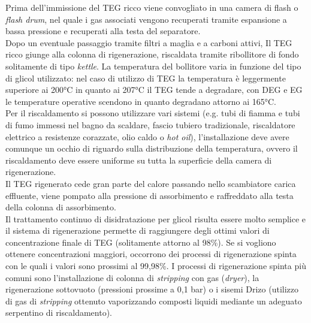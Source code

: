 Prima dell'immissione del TEG ricco viene convogliato in una camera di flash o \textit{flash drum}, nel quale i gas associati vengono recuperati tramite espansione a bassa pressione e recuperati alla testa del separatore. \\
Dopo un eventuale passaggio tramite filtri a maglia e a carboni attivi, Il TEG ricco giunge alla colonna di rigenerazione, riscaldata tramite ribollitore di fondo solitamente di tipo \textit{kettle}. La temperatura del bollitore varia in funzione del tipo di glicol utilizzato: nel caso di utilizzo di TEG la temperatura è leggermente superiore ai 200°C in quanto ai 207°C il TEG tende a degradare, con DEG e EG le temperature operative scendono in quanto degradano attorno ai 165°C.\\
Per il riscaldamento si possono utilizzare vari sistemi (e.g. tubi di fiamma e tubi di fumo immessi nel bagno da scaldare, fascio tubiero tradizionale, riscaldatore elettrico a resistenze corazzate, olio caldo o \textit{hot oil}), l'installazione deve avere comunque un occhio di riguardo sulla distribuzione della temperatura, ovvero il riscaldamento deve essere uniforme su tutta la superficie della camera di rigenerazione. \\
Il TEG rigenerato cede gran parte del calore passando nello scambiatore carica effluente, viene pompato alla pressione di assorbimento e raffreddato alla testa della colonna di assorbimento.\\
Il trattamento continuo di disidratazione per glicol risulta essere molto semplice e il sistema di rigenerazione permette di raggiungere degli ottimi valori di concentrazione finale di TEG (solitamente attorno  al 98\%). Se si vogliono ottenere concentrazioni maggiori, occorrono dei processi di rigenerazione spinta con le quali i valori sono prossimi al 99,98\%. I processi di rigenerazione spinta più comuni sono l'installazione di colonna di \textit{stripping} con gas (\textit{dryer}), la rigenerazione sottovuoto (pressioni prossime a 0,1 bar) o i sisemi Drizo (utilizzo di gas di \textit{stripping} ottenuto vaporizzando composti liquidi mediante un adeguato serpentino di riscaldamento).

